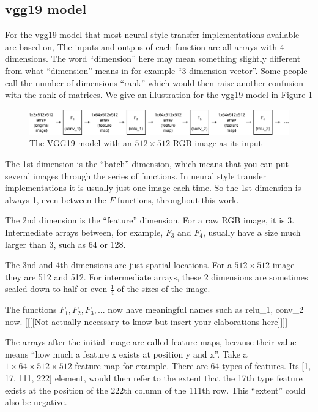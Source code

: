 \documentclass[runningheads]{llncs}
\begin{document}
\subsection{vgg19 model}
For the vgg19 model that most neural style transfer implementations available are based on,
The inputs and outpus of each function are all arrays with 4 dimensions.
The word ``dimension'' here may mean something slightly different from what ``dimension'' means in
for example ``$3$-dimension vector''. 
Some people call the number of dimensions ``rank'' which would then raise another confusion with the rank of matrices.
We give an illustration for the vgg19 model in Figure \ref{vgg512}
\begin{figure}
\center
\includegraphics[width=\textwidth]{vgg512.pdf}
\caption{The VGG19 model with an $512\times512$ RGB image as its input \label{vgg512}}
\end{figure}

The 1st dimension is the ``batch'' dimension, which means that you can put several images through the
series of functions.
In neural style transfer implementations it is usually just one image each time.
So the 1st dimension is always 1, even between the $F$ functions, throughout this work.

The 2nd dimension is the ``feature'' dimension. For a raw RGB image, it is 3.
Intermediate arrays between, for example, $F_3$ and $F_4$, usually 
have a size much larger than 3, such as 64 or 128.

The 3nd and 4th dimensions are just spatial locations. 
For a $512\times512$ image they are 512 and 512. 
For intermediate arrays, these 2 dimensions are sometimes scaled down
to half or even $\frac{1}{4}$ of the sizes of the image.

The functions $F_1,F_2,F_3,...$ now have meaningful names such as relu\_1, conv\_2 now.
[[[[Not actually necessary to know but insert your elaborations here]]]]

The arrays after the initial image are called feature maps, because their value means
``how much a feature x exists at position y and x''.
Take a $1\times64\times512\times512$ feature map for example. There are 64 types of features.
Its [1, 17, 111, 222] element, would then refer to the extent that the 17th type feature exists
at the position of the 222th column of the 111th row. This ``extent'' could also be negative.
\end{document}
